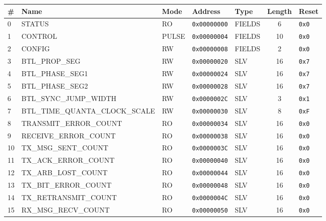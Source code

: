 \documentclass{article}
\begin{document}
\begin{table}[h!]
  \begin{center}
    \label{tab:table1}
    \begin{tabularx}{\linewidth}{|l|X|l|l|l|c|l|}
      \hline
      \textbf{\#} & \textbf{Name} & \textbf{Mode} & \textbf{Address} & \textbf{Type} & \textbf{Length} &
      \textbf{Reset} \\
      \hline
      0 & STATUS & RO & \texttt{0x00000000} & FIELDS & 6 & \texttt{0x0} \\
      \hline
      1 & CONTROL & PULSE & \texttt{0x00000004} & FIELDS & 10 & \texttt{0x0} \\
      \hline
      2 & CONFIG & RW & \texttt{0x00000008} & FIELDS & 2 & \texttt{0x0} \\
      \hline
      3 & BTL{\_}PROP{\_}SEG & RW & \texttt{0x00000020} & SLV & 16 & \texttt{0x7} \\
      \hline
      4 & BTL{\_}PHASE{\_}SEG1 & RW & \texttt{0x00000024} & SLV & 16 & \texttt{0x7} \\
      \hline
      5 & BTL{\_}PHASE{\_}SEG2 & RW & \texttt{0x00000028} & SLV & 16 & \texttt{0x7} \\
      \hline
      6 & BTL{\_}SYNC{\_}JUMP{\_}WIDTH & RW & \texttt{0x0000002C} & SLV & 3 & \texttt{0x1} \\
      \hline
      7 & BTL{\_}TIME{\_}QUANTA{\_}CLOCK{\_}SCALE & RW & \texttt{0x00000030} & SLV & 8 & \texttt{0xF} \\
      \hline
      8 & TRANSMIT{\_}ERROR{\_}COUNT & RO & \texttt{0x00000034} & SLV & 16 & \texttt{0x0} \\
      \hline
      9 & RECEIVE{\_}ERROR{\_}COUNT & RO & \texttt{0x00000038} & SLV & 16 & \texttt{0x0} \\
      \hline
      10 & TX{\_}MSG{\_}SENT{\_}COUNT & RO & \texttt{0x0000003C} & SLV & 16 & \texttt{0x0} \\
      \hline
      11 & TX{\_}ACK{\_}ERROR{\_}COUNT & RO & \texttt{0x00000040} & SLV & 16 & \texttt{0x0} \\
      \hline
      12 & TX{\_}ARB{\_}LOST{\_}COUNT & RO & \texttt{0x00000044} & SLV & 16 & \texttt{0x0} \\
      \hline
      13 & TX{\_}BIT{\_}ERROR{\_}COUNT & RO & \texttt{0x00000048} & SLV & 16 & \texttt{0x0} \\
      \hline
      14 & TX{\_}RETRANSMIT{\_}COUNT & RO & \texttt{0x0000004C} & SLV & 16 & \texttt{0x0} \\
      \hline
      15 & RX{\_}MSG{\_}RECV{\_}COUNT & RO & \texttt{0x00000050} & SLV & 16 & \texttt{0x0} \\

\end{tabularx}
\end{center}
\end{table}
\end{document}
